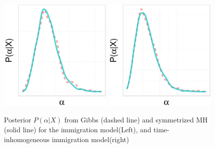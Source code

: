   \begin{figure}[H]
  \centering

  \begin{minipage}[!hp]{0.49\linewidth}
    \includegraphics [width=0.49\textwidth, angle=0]{figs/QC_ks/qc_hist_4_03_10_.pdf}
    \includegraphics [width=0.49\textwidth, angle=0]{figs/Q_ks/q_hist_25_03_10_.pdf}
  \end{minipage}
  \begin{minipage}[!hp]{0.49\linewidth}
    \caption{Posterior $P(\alpha|X)$ from Gibbs (dashed line) and symmetrized MH (solid line) for the immigration model(Left), and time-inhomogeneous immigration model(right)}
     \label{fig:HIST_QCQ}
  \end{minipage}
  \end{figure}

